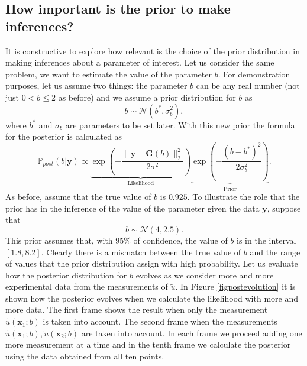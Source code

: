 \documentclass[12pt]{book}
\newcommand{\post}{\mathbb{P}_{post}}
\newcommand{\x}{\textbf{x}}
\begin{document}
\subsection*{How important is the prior to make inferences?}
It is constructive to  explore how relevant is the choice  of the prior distribution
in making inferences about a parameter of interest. Let us consider the same problem,
we want to estimate
the value of the parameter $b$. For demonstration purposes, let us assume two things: the parameter
$b$ can be any real number (not just $0<b\leq 2$ as before) and we assume a prior distribution for $b$ as
\begin{equation*}
b\sim\mathscr{N}(b^{*},\sigma_{b}^{2}),
\end{equation*}
where $b^{*}$ and $\sigma_{b}$ are parameters to be set later.  With this new prior the formula
for the posterior is calculated as 
\begin{equation*}
\post(b|\textbf{y})\propto\underbrace{\exp\left(-\frac{\|\textbf{y}-\textbf{G}(b)\|_{2}^{2}}{2\sigma^{2}}\right)}_{\text{Likelihood}}\underbrace{\exp\left(-\frac{(b-b^{*})^{2}}{2\sigma_{b}^{2}}\right)}_{\text{Prior}}.
\end{equation*}
As before, assume that the true
value of $b$ is $0.925$. To illustrate the role that the prior has in the inference of the value
of the parameter given the data $\textbf{y}$, suppose that 
\begin{equation*}
b\sim\mathscr{N}(4,2.5).
\end{equation*}
This prior assumes that, with $95\%$ of confidence, the value of
$b$ is in the interval $[1.8,8.2]$. Clearly there is a mismatch between
the true value of $b$ and the range of values that the prior distribution
assign with high probability. Let us evaluate how the posterior
distribution for $b$ evolves as we consider more and more experimental
data from the measurements of $\tilde{u}$.  In Figure \ref{figpostevolution} it is shown
how the posterior evolves when we calculate the likelihood with more 
and more data. The first frame shows the result when only the measurement
$\tilde{u}(\x_{1};b)$ is taken into account. The second frame
when the measurements $\tilde{u}(\x_{1};b),\tilde{u}(\x_{2};b)$ are taken
into account. In each frame we proceed adding one more measurement 
at a time and in the tenth frame we calculate the posterior
using the data obtained from all ten points.
\end{document}

